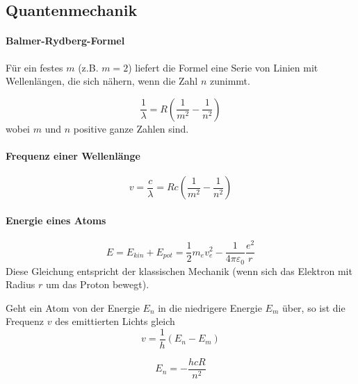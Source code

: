 \documentclass[7pt]{article}
\begin{document}
\begin{multicols}{3}
	
\section{Quantenmechanik}

\paragraph{Balmer-Rydberg-Formel}

Für ein festes $m$ (z.B. $m = 2$) liefert die Formel eine Serie von Linien mit Wellenlängen, die sich nähern, wenn die Zahl $n$ zunimmt.

\begin{equation*}
	\frac{1}{\lambda} = R(\frac{1}{m^2}-\frac{1}{n^2})
\end{equation*}
wobei $m$ und $n$ positive ganze Zahlen sind. \newline

\paragraph{Frequenz einer Wellenlänge}

\begin{equation*}
	v = \frac{c}{\lambda} = Rc(\frac{1}{m^2} - \frac{1}{n^2})
\end{equation*}

\paragraph{Energie eines Atoms}

\begin{equation*}
	E = E_{kin} + E_{pot} = \frac{1}{2}m_e v_e^2 - \frac{1}{4\pi\varepsilon _0}\frac{e^2}{r}
\end{equation*}
Diese Gleichung entspricht der klassischen Mechanik (wenn sich das Elektron mit Radius $r$ um das Proton bewegt). \newline

Geht ein Atom von der Energie $E_n$ in die niedrigere Energie $E_m$ über, so ist die Frequenz $v$ des emittierten Lichts gleich
\begin{equation*}
	v = \frac{1}{h}(E_n - E_m)
\end{equation*}

\begin{equation*}
	E_n = -\frac{hcR}{n^2}
\end{equation*}


\end{multicols}
\end{document}
